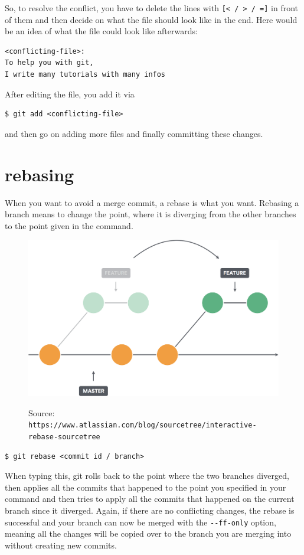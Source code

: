 \documentclass[a4paper, 12pt]{article}
\begin{document}
	So, to resolve the conflict, you have to delete the lines with \lstinline|[< / > / =]| in front of them and then decide on what the file should look like in the end. Here would be an idea of what the file could look like afterwards:
	
		\begin{lstlisting}
<conflicting-file>:
To help you with git,
I write many tutorials with many infos
	\end{lstlisting}
	
	After editing the file, you add it via
	
	\begin{lstlisting}
$ git add <conflicting-file>
	\end{lstlisting}
	
	and then go on adding more files and finally committing these changes.
		
	\section{rebasing}
		When you want to avoid a merge commit, a rebase is what you want. Rebasing a branch means to change the point, where it is diverging from the other branches to the point given in the command.
		
		\begin{figure}[h]
			\centering
			\includegraphics[width=.725\linewidth]{gitrebase.png}
			\label{fig1}
			\caption{Source: \newline\lstinline|https://www.atlassian.com/blog/sourcetree/interactive-rebase-sourcetree|}
		\end{figure}
		
		\begin{lstlisting}
$ git rebase <commit id / branch>
		\end{lstlisting}
		
		When typing this, git rolls back to the point where the two branches diverged, then applies all the commits that happened to the point you specified in your command and then tries to apply all the commits that happened on the current branch since it diverged. Again, if there are no conflicting changes, the rebase is successful and your branch can now be merged with the \lstinline|--ff-only| option, meaning all the changes will be copied over to the branch you are merging into without creating new commits.
		
\end{document}
